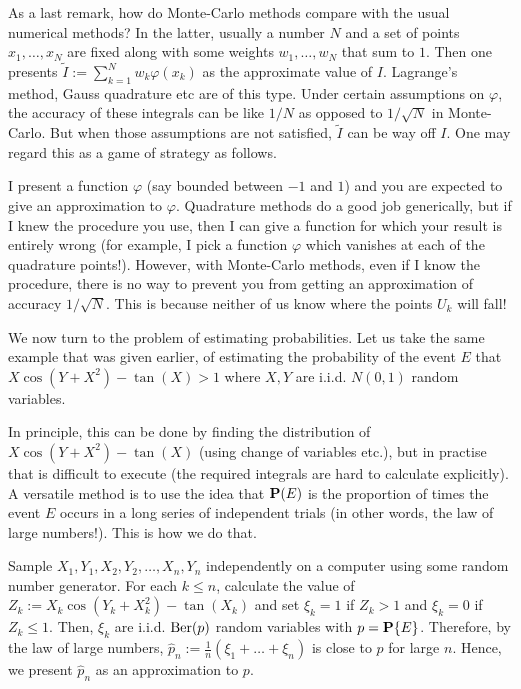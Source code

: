 \documentclass[preprint,  11pt]{amsart}
\renewcommand\phi{{\varphi}}
\begin{document}
As a last remark, how do Monte-Carlo methods compare with the usual numerical methods? In the latter, usually a number $N$ and a set of points $x_{1},\ldots ,x_{N}$ are fixed along with some weights $w_{1},\ldots ,w_{N}$ that sum to $1$. Then one presents $\tilde{I}:=\sum_{k=1}^{N}w_{k}\phi(x_{k})$ as the approximate value of $I$. Lagrange's method, Gauss quadrature etc are of this type. Under certain assumptions on $\phi$, the accuracy of these integrals can be like $1/N$ as opposed to $1/\sqrt{N}$ in Monte-Carlo. But when those assumptions are not satisfied, $\tilde{I}$ can be way off $I$. One may regard this as a game of strategy as follows.

I present a function $\phi$ (say bounded between $-1$ and $1$)  and you are expected to give an approximation to $\phi$. Quadrature methods do a good job generically, but if I knew the procedure you use, then I can give a function for which your result is entirely wrong (for example, I pick a function $\phi$ which vanishes at each of the quadrature points!). However, with Monte-Carlo methods, even if I know the procedure, there is no way to prevent you from getting an approximation of accuracy $1/\sqrt{N}$. This is because neither of us know where the points $U_{k}$ will fall!

 We now turn to the problem of estimating probabilities. Let us take the same example that was given earlier, of estimating the probability of the event $E$ that $X\cos(Y+X^2)-\tan(X)>1$ where $X,Y$ are i.i.d. $N(0,1)$ random variables. 

In principle, this can be done by finding the distribution of $X\cos(Y+X^2)-\tan(X)$ (using change of variables etc.), but in practise that is difficult to execute (the required integrals are hard to calculate explicitly). A versatile method is to use the idea that $\P(E)$ is the proportion of times the event $E$ occurs in a long series of independent trials (in other words, the law of large numbers!). This is how we do that.

Sample $X_1,Y_1,X_2,Y_2,\ldots,X_n,Y_n$ independently on a computer using some random number generator. For each $k\le n$, calculate the value of $Z_k:=X_k\cos(Y_k+X_k^2)-\tan(X_k)$ and set $\xi_k=1$ if $Z_k>1$ and $\xi_k=0$ if $Z_k\le 1$. Then, $\xi_k$ are i.i.d. $\mb{Ber}(p)$ random variables with $p=\P\{E\}$. Therefore, by the law of large numbers, $\hat{p}_n:=\frac{1}{n}(\xi_1+\ldots +\xi_n)$ is close to $p$ for large $n$. Hence, we present $\hat{p}_n$ as an approximation to $p$.
\end{document}
